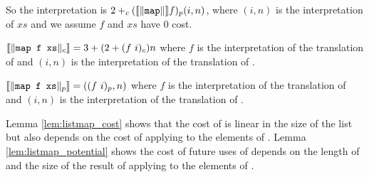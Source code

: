So the interpretation is $2 +_c (\llbracket\|\texttt{map}\|\rrbracket f)_p (i,n)$,
where $(i,n)$ is the interpretation of $xs$ and we assume $f$ and $xs$ have $0$
cost.
%
\begin{lemma}
  \label{lem:listmap_cost}
  $\LB\|\T{map f xs}\|_c\RB = 3 + (2 + (f\ i)_c)n$ where $f$ is the
  interpretation of the translation of  and $(i,n)$ is the interpretation
  of the translation of .
\end{lemma}
%
\begin{lemma}
  \label{lem:listmap_potential}
  $\llbracket\|\texttt{map f xs}\|_p\rrbracket = ((f\ i)_p,n)$ where $f$ is the
  interpretation of the translation of  and $(i,n)$ is the interpretation
  of the translation of .
\end{lemma}
%
Lemma \ref{lem:listmap_cost} shows that the cost of  is linear in
the size of the list but also depends on the cost of applying  to the
elements of . Lemma \ref{lem:listmap_potential} shows the cost of future
uses of  depends on the length of  and the size of the result
of applying  to the elements of .
